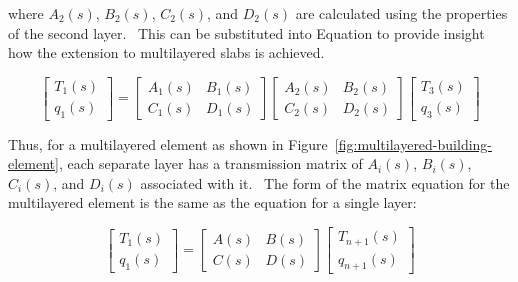 where \(A_2(s)\), \(B_2(s)\), \(C_2(s)\), and \(D_2(s)\) are calculated using the properties of the second layer.~ This can be substituted into Equation to provide insight how the extension to multilayered slabs is achieved.

\begin{equation}
\left[ {\begin{array}{ccc}{{T_1}\left( s \right)}\\ {{q_1}\left( s \right)}\end{array}} \right] = \left[ {\begin{array}{ccc}{{A_1}\left( s \right)}&{{B_1}\left( s \right)}\\ {{C_1}\left( s \right)}&{{D_1}\left( s \right)}\end{array}} \right]\left[ {\begin{array}{ccc}{{A_2}\left( s \right)}&{{B_2}\left( s \right)}\\ {{C_2}\left( s \right)}&{{D_2}\left( s \right)}\end{array}} \right]\left[ {\begin{array}{ccc}{{T_3}\left( s \right)}\\ {{q_3}\left( s \right)}\end{array}} \right]
\end{equation}

Thus, for a multilayered element as shown in Figure~\ref{fig:multilayered-building-element}, each separate layer has a transmission matrix of \(A_i(s)\), \(B_i(s)\), \(C_i(s)\), and \(D_i(s)\) associated with it.~ The form of the matrix equation for the multilayered element is the same as the equation for a single layer:

\begin{equation}
\left[ {\begin{array}{ccc}{{T_1}\left( s \right)}\\ {{q_1}\left( s \right)}\end{array}} \right] = \left[ {\begin{array}{ccc}{A\left( s \right)}&{B\left( s \right)}\\ {C\left( s \right)}&{D\left( s \right)}\end{array}} \right]\left[ {\begin{array}{ccc}{{T_{n + 1}}\left( s \right)}\\ {{q_{n + 1}}\left( s \right)}\end{array}} \right]
\label{eq:LaplaceMultiLayerMatrix}
\end{equation}

